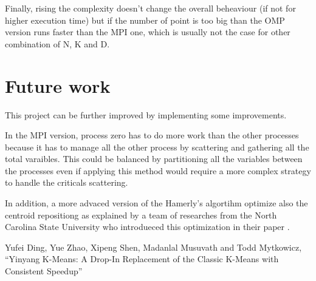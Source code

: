 \documentclass[conference]{IEEEtran}
\begin{document}
Finally, rising the complexity doesn't change the overall beheaviour (if not for higher execution time) but if the number of point is too big than the OMP version runs faster than the MPI one, which is usually not the case for other combination of N, K and D.

\section{Future work}
This project can be further improved by implementing some improvements.

In the MPI version, process zero has to do more work than the other processes because it has to manage all the other process by scattering and gathering all the total varaibles. This could be balanced by partitioning all the variables between the processes even if applying this method would require a more complex strategy to handle the criticals scattering.

In addition, a more advaced version of the Hamerly's algortihm optimize also the centroid repositiong as explained by a team of researches from the North Carolina State University who introdueced this optimization in their paper \cite{b1} .

\begin{thebibliography}{00}
   Yufei Ding, Yue Zhao, Xipeng Shen, Madanlal Musuvath and Todd Mytkowicz, ``Yinyang K-Means: A Drop-In Replacement of the Classic K-Means
  with Consistent Speedup''
\end{thebibliography}
\end{document}
